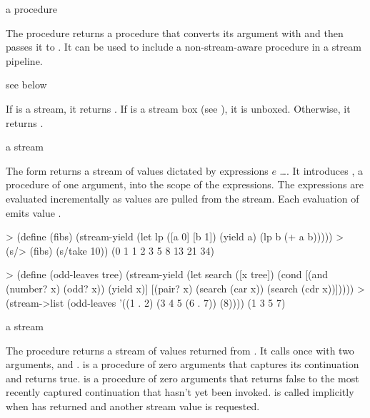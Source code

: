 \begin{procedure}
\end{procedure}
\returns{} a procedure

The  procedure returns a procedure that converts its argument with
 and then passes it to . It can be used to include a
non-stream-aware procedure in a stream pipeline.

\begin{procedure}
\end{procedure}
\returns{} see below

If  is a stream, it returns . If  is a stream
box (see ), it is unboxed. Otherwise, it returns .

\begin{syntax}
\end{syntax}
\expandsto{} a stream

The  form returns a stream of values dictated by expressions $e$ \ldots. It
introduces , a procedure of one argument, into the scope of the expressions.
The expressions are evaluated incrementally as values are pulled from the stream. Each
evaluation of  emits value .

\codebegin
> (define (fibs)
    (stream-yield
     (let lp ([a 0] [b 1])
       (yield a)
       (lp b (+ a b)))))
> (s/> (fibs) (s/take 10))
(0 1 1 2 3 5 8 13 21 34)
\codeend

\codebegin
> (define (odd-leaves tree)
    (stream-yield
     (let search ([x tree])
       (cond
        [(and (number? x) (odd? x))
         (yield x)]
        [(pair? x)
         (search (car x))
         (search (cdr x))]))))
> (stream->list (odd-leaves '((1 . 2) (3 4 5 (6 . 7)) (8))))
(1 3 5 7)
\codeend

\begin{procedure}
\end{procedure}
\returns{} a stream

The  procedure returns a stream of values returned from
. It calls  once with two arguments,  and
.  is a procedure of zero arguments that captures its continuation and
returns true.  is a procedure of zero arguments that returns false to the most
recently captured  continuation that hasn't yet been invoked.  is
called implicitly when  has returned and another stream value is requested.

